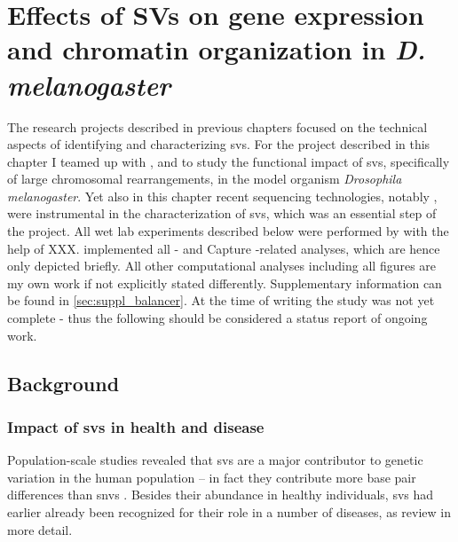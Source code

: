 \chapter{Effects of SVs on gene expression and chromatin
organization in \texorpdfstring{\textit{D. melanogaster}}{D. melanogaster}}
\label{sec:balancer}



The research projects described in previous chapters focused on the technical
aspects of identifying and characterizing \acp{sv}. For the project described in
this chapter I teamed up with \yad, \alek and \eileen to study the functional
impact of \acp{sv}, specifically of large chromosomal rearrangements, in the model
organism \textit{Drosophila melanogaster}. Yet also in this chapter recent
sequencing technologies, notably \hic, were instrumental in the characterization
of \acp{sv}, which was an essential step of the project. All wet lab experiments
described below were performed by \yad with the help of XXX.
\alek implemented all \hic- and Capture \hic-related analyses, which are hence
only depicted briefly. All other computational analyses including all figures
are my own work if not explicitly stated differently. Supplementary information
can be found in \cref{sec:suppl_balancer}. At the time of writing the study was
not yet complete - thus the following should be considered a status report of
ongoing work.



\section{Background}
\label{sec:balancer_background}


\subsection{Impact of \texorpdfstring{\acp{sv}}{SVs} in health and disease}

Population-scale studies revealed that \acp{sv} are a major contributor to
genetic variation in the human population \citep{Conrad2010} – in fact they
contribute more base pair differences than \acp{snv} \citep{Sudmant2015}.
Besides their abundance in healthy individuals, \acp{sv} had earlier already
been recognized for their role in a number of diseases, as
\citet{Zhang2009,Weischenfeldt2013,Carvalho2016} review in more detail.

